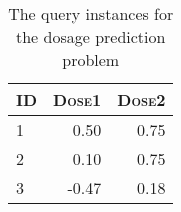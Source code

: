 \documentclass[solution]{ditpaper}
\begin{document}
\begin{table}[h]
\begin{center}
\caption{The query instances for the dosage prediction problem}
\label{tab:dosagePrd}
\noindent\begin{tabular}{@{} l r r@{}}
\hline
				\textsc{ID} & \textsc{Dose1} & \textsc{Dose2} \\
\hline
		1 & 0.50 & 0.75 \\
		2 & 0.10 & 0.75 \\
		3 & -0.47 & 0.18 \\
\hline
\end{tabular}
\end{center}
\end{table}
\end{document}
